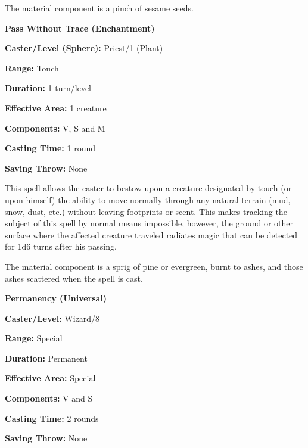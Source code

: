 \begin{multicols}{2}
The material component is a pinch of sesame seeds.

\vspace{1em}

\noindent
\begin{minipage}{\columnwidth}

\noindent \textbf{Pass Without Trace (Enchantment)}

\noindent \textbf{Caster/Level (Sphere):} Priest/1 (Plant)

\noindent \textbf{Range:} Touch

\noindent \textbf{Duration:} 1 turn/level

\noindent \textbf{Effective Area:} 1 creature

\noindent \textbf{Components:} V, S and M

\noindent \textbf{Casting Time:} 1 round

\noindent \textbf{Saving Throw:} None

\end{minipage}

This spell allows the caster to bestow upon a creature designated by touch (or upon himself) the ability to move normally through any natural terrain (mud, snow, dust, etc.) without leaving footprints or scent.  This makes tracking the subject of this spell by normal means impossible, however, the ground or other surface where the affected creature traveled radiates magic that can be detected for 1d6 turns after his passing.  

The material component is a sprig of pine or evergreen, burnt to ashes, and those ashes scattered when the spell is cast.

\vspace{1em}

\noindent
\begin{minipage}{\columnwidth}

\noindent \textbf{Permanency (Universal)}

\noindent \textbf{Caster/Level:} Wizard/8

\noindent \textbf{Range:} Special

\noindent \textbf{Duration:} Permanent

\noindent \textbf{Effective Area:} Special

\noindent \textbf{Components:} V and S

\noindent \textbf{Casting Time:} 2 rounds

\noindent \textbf{Saving Throw:} None

\end{minipage}


\end{multicols}

